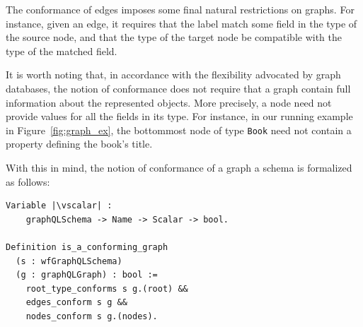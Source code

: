 The conformance of edges imposes some final natural restrictions on
graphs. For instance, given an edge, it requires that the label match
some field in the type of the source node, and that the type of the
target node be compatible with the type of the matched field. 



It is worth noting that, in accordance with the flexibility advocated
by graph databases, the notion of conformance does not require that a
graph contain full information about the represented
objects. More precisely, a node need not provide values for all the fields
in its type. For instance, in our running example in
Figure~\ref{fig:graph_ex}, the bottommost node of type \texttt{Book} need not
contain a property defining the book's title.






With this in mind, the notion of conformance of a graph \wrt a schema is formalized as follows:
%
\begin{verbatim}
Variable |\vscalar| : 
    graphQLSchema -> Name -> Scalar -> bool.
  
Definition is_a_conforming_graph 
  (s : wfGraphQLSchema) 
  (g : graphQLGraph) : bool :=
    root_type_conforms s g.(root) &&
    edges_conform s g &&
    nodes_conform s g.(nodes).
\end{verbatim}
%

